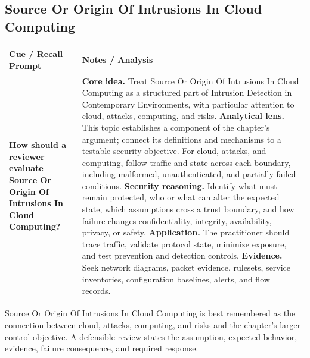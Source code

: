 \documentclass[11pt]{article}
\newcommand{\CornellHeader}{%
\rowcolor{Navy}\color{white}\bfseries Cue / Recall Prompt & \color{white}\bfseries Notes / Analysis\\\hline}
\newcommand{\CornellRow}[2]{%
\cellcolor{CueGray}\RaggedRight\textbf{#1} & \RaggedRight #2\\\hline}
\begin{document}
\subsection*{Source Or Origin Of Intrusions In Cloud Computing}
\begin{longtable}{>{\RaggedRight\arraybackslash}p{}|>{\RaggedRight\arraybackslash}p{}}
\CornellHeader
\CornellRow{How should a reviewer evaluate Source Or Origin Of Intrusions In Cloud Computing?}{\textbf{Core idea.} Treat Source Or Origin Of Intrusions In Cloud Computing as a structured part of Intrusion Detection in Contemporary Environments, with particular attention to cloud, attacks, computing, and risks. \textbf{Analytical lens.} This topic establishes a component of the chapter's argument; connect its definitions and mechanisms to a testable security objective. For cloud, attacks, and computing, follow traffic and state across each boundary, including malformed, unauthenticated, and partially failed conditions. \textbf{Security reasoning.} Identify what must remain protected, who or what can alter the expected state, which assumptions cross a trust boundary, and how failure changes confidentiality, integrity, availability, privacy, or safety. \textbf{Application.} The practitioner should trace traffic, validate protocol state, minimize exposure, and test prevention and detection controls. \textbf{Evidence.} Seek network diagrams, packet evidence, rulesets, service inventories, configuration baselines, alerts, and flow records.}
\end{longtable}
\begin{topicsummary}
Source Or Origin Of Intrusions In Cloud Computing is best remembered as the connection between cloud, attacks, computing, and risks and the chapter's larger control objective. A defensible review states the assumption, expected behavior, evidence, failure consequence, and required response.
\end{topicsummary}
\end{document}
